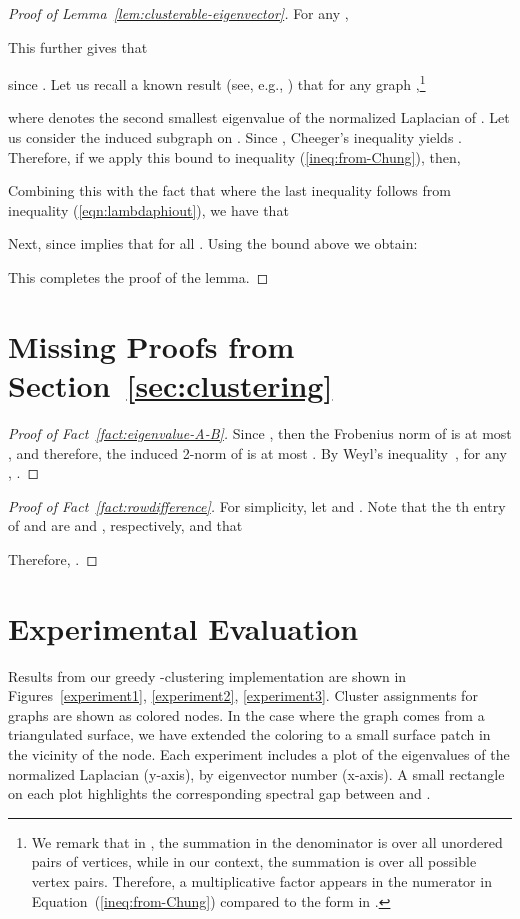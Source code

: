 \documentclass[11pt]{article}
\theoremstyle{plain}
\begin{document}
\begin{proof}[Proof of Lemma~\ref{lem:clusterable-eigenvector}]
\label{lem:clusterable-eigenvector-proof}
For any ,

This further gives that

since .
Let us recall a known result (see, e.g., \cite[(1.5), p.~5 and (1.14), p.~13]{Chu97:spectral}) that for any graph ,\footnote{We remark that in \cite{Chu97:spectral}, the summation in the denominator is over all unordered pairs of vertices, while in our context, the summation is over all possible  vertex pairs. Therefore, a multiplicative factor  appears in the numerator in Equation~(\ref{ineq:from-Chung}) compared to the form in \cite[(1.5), p.~5]{Chu97:spectral}.}

where  denotes the second smallest eigenvalue of the normalized Laplacian of . Let us consider the induced subgraph  on .
Since ,
Cheeger's inequality
yields . Therefore, if we apply this bound to inequality (\ref{ineq:from-Chung}), then,

Combining this with the fact that  where the last inequality follows from inequality (\ref{eqn:lambdaphiout}), we have that

Next, since  implies that  for all . Using the bound above we obtain:

This completes the proof of the lemma.
\end{proof}


\section{Missing Proofs from Section~\ref{sec:clustering}}
\label{sec:facts}

\begin{proof}[Proof of Fact~\ref{fact:eigenvalue-A-B}]
Since ,
then the Frobenius norm  of  is at
most , and therefore, the induced 2-norm
 of  is at most
. By Weyl's inequality~\cite{Tao12:randommatrix}, for any
, .
\end{proof}

\begin{proof}[Proof of Fact~\ref{fact:rowdifference}]
For simplicity, let  and
. Note that the th entry of  and  are 
and , respectively, and that

Therefore,
. \end{proof}

\section{Experimental Evaluation}\label{sec:experiments}
Results from our greedy -clustering implementation are shown
in Figures~\ref{experiment1}, \ref{experiment2}, \ref{experiment3}.
Cluster assignments for graphs are shown as colored nodes.
In the case where the graph comes from a triangulated surface, we have extended
the coloring to a small surface patch in the vicinity of the node. Each
experiment includes a plot of the eigenvalues of the normalized Laplacian (y-axis), by eigenvector number (x-axis).
A small rectangle on each plot highlights the corresponding spectral gap
between  and .
\end{document}
